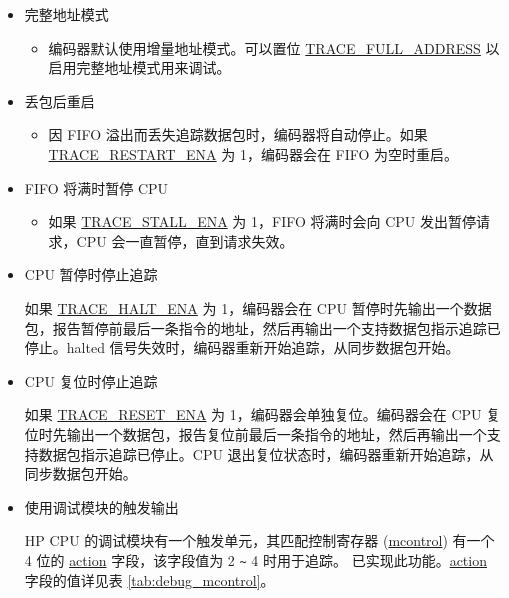 \documentclass[main\_\_CN.tex]{subfiles}
\begin{document}
\begin{itemize}
    \item 完整地址模式
        \begin{itemize}
            \item 编码器默认使用增量地址模式。可以置位 \hyperref[fielddesc:TRACEFULLADDRESS]{TRACE\_FULL\_ADDRESS} 以启用完整地址模式用来调试。
        \end{itemize}

        \item 丢包后重启
            \begin{itemize}
                \item 因 FIFO 溢出而丢失追踪数据包时，编码器将自动停止。如果 \hyperref[fielddesc:TRACERESTARTENA]{TRACE\_RESTART\_ENA} 为 1，编码器会在 FIFO 为空时重启。
            \end{itemize}

        \item FIFO 将满时暂停 CPU
            \begin{itemize}
                \item 如果 \hyperref[fielddesc:TRACESTALLENA]{TRACE\_STALL\_ENA} 为 1，FIFO 将满时会向 CPU 发出暂停请求，CPU 会一直暂停，直到请求失效。
            \end{itemize}

        \item CPU 暂停时停止追踪

            如果 \hyperref[fielddesc:TRACEHALTENA]{TRACE\_HALT\_ENA} 为 1，编码器会在 CPU 暂停时先输出一个数据包，报告暂停前最后一条指令的地址，然后再输出一个支持数据包指示追踪已停止。halted 信号失效时，编码器重新开始追踪，从同步数据包开始。

        \item CPU 复位时停止追踪

            如果 \hyperref[fielddesc:TRACERESETENA]{TRACE\_RESET\_ENA} 为 1，编码器会单独复位。编码器会在 CPU 复位时先输出一个数据包，报告复位前最后一条指令的地址，然后再输出一个支持数据包指示追踪已停止。CPU 退出复位状态时，编码器重新开始追踪，从同步数据包开始。

        \item 使用调试模块的触发输出

            HP CPU 的调试模块有一个触发单元，其匹配控制寄存器 (\hyperref[regdesc:MCONTROL]{mcontrol}) 有一个 4 位的 \hyperref[fielddesc:MCONTROLACTION]{action} 字段，该字段值为 2 \verb+~+ 4 时用于追踪。\chipname{} 已实现此功能。\hyperref[fielddesc:MCONTROLACTION]{action} 字段的值详见表 \ref{tab:debug_mcontrol}。


\end{itemize}
\end{document}
